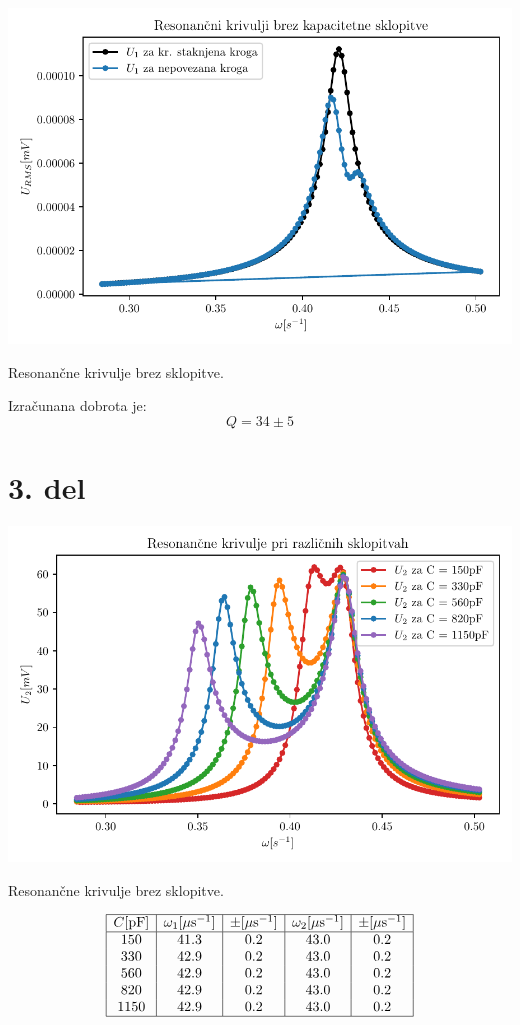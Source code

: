 \documentclass[12pt]{report}
\begin{document}
\begin{slika}[H]
  \centering
  \includegraphics{vsiljenoU1}
  \caption{\small Resonančne krivulje brez sklopitve.}
\end{slika}

Izračunana dobrota je: 
\[
Q = 34 \pm 5
\]

\section*{3. del}

\begin{slika}[H]
  \centering
  \includegraphics{vsiljenoU2}
  \caption{\small Resonančne krivulje brez sklopitve.}
\end{slika}


\begin{tabela}[H]
  \centering
  \[
    \begin{array}{|c|c|c|c|c|}\hline 
      C [\si{pF}] & \omega_1 [\si{\mu s^{-1}}] & \pm [\si{\mu s^{-1}}] & \omega_2 [\si{\mu s^{-1}}] & \pm [\si{\mu s^{-1}}]\\ \hline 
      150 & 41.3 &     0.2 &    43.0 &     0.2\\
      330 & 42.9 &     0.2 &    43.0 &     0.2\\
      560 & 42.9 &     0.2 &    43.0 &     0.2\\
      820 & 42.9 &     0.2 &    43.0 &     0.2\\
      1150 & 42.9 &     0.2 &    43.0 &     0.2\\ \hline
    \end{array}
  \]
\end{tabela}
\end{document}
